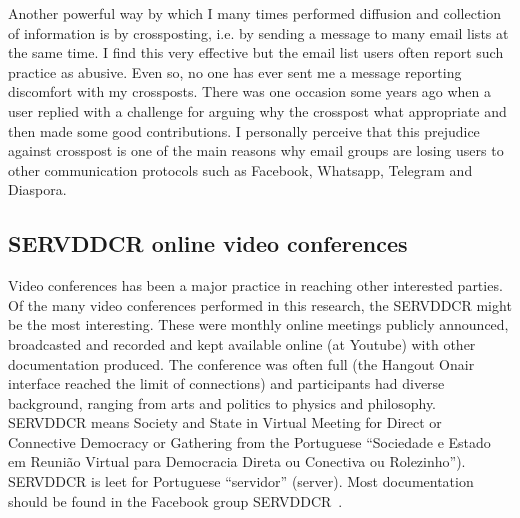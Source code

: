 \begin{apendicesenv}

Another powerful way by which I many times performed diffusion and collection
of information is by crossposting, i.e. by sending a message to many email lists
at the same time.
I find this very effective but the email list users often report such practice
as abusive.
Even so, no one has ever sent me a message reporting discomfort with my crossposts.
There was one occasion some years ago when a user replied with a challenge for
arguing why the crosspost what appropriate and then made some good contributions.
I personally perceive that this prejudice against crosspost is one of the main reasons
why email groups are losing users to other communication protocols such as Facebook, Whatsapp, Telegram and Diaspora.

\subsection{SERVDDCR online video conferences}\label{sec:serv}
Video conferences has been a major practice in reaching other interested parties.
Of the many video conferences performed in this research,
the SERVDDCR might be the most interesting.
These were monthly online meetings publicly announced, broadcasted and
recorded and kept available online (at Youtube) with other documentation produced.
The conference was often full (the Hangout Onair interface reached the limit of connections)
and participants had diverse background, ranging from arts and politics to physics and philosophy.
SERVDDCR means Society and State in Virtual Meeting for Direct or Connective Democracy or Gathering
from the Portuguese ``Sociedade e Estado em Reunião Virtual para Democracia Direta ou Conectiva ou Rolezinho'').
SERVDDCR is leet for Portuguese ``servidor'' (server).
Most documentation should be found in the Facebook group SERVDDCR~\cite{servidor}.


\end{apendicesenv}
